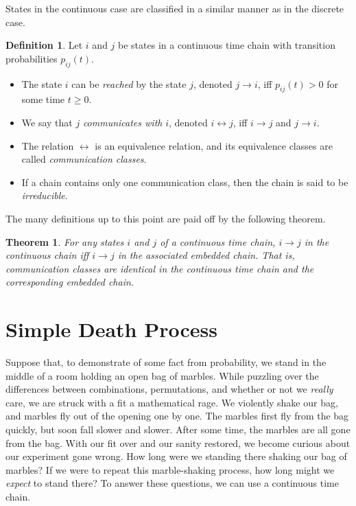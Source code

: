 \documentclass[12pt]{article}
\newtheorem{thm}{Theorem}[section]
\theoremstyle{definition}
\newtheorem{defn}{Definition}
\begin{document}
States in the continuous case are classified in a similar manner as in the
discrete case.

\begin{defn}
    \label{defn:continuous-classes}
    Let $i$ and $j$ be states in a continuous time chain with transition
    probabilities $p_{ij}(t)$.
    \begin{itemize}
        \item The state $i$ can be \emph{reached} by the state $j$, denoted $j
        \to i$, iff $p_{ij}(t) > 0$ for some time $t \geq 0$.

        \item We say that $j$ \emph{communicates with} $i$, denoted $i
        \leftrightarrow j$, iff $i \to j$ and $j \to i$.

        \item The relation $\leftrightarrow$ is an equivalence relation, and
        its equivalence classes are called \emph{communication classes}. 

        \item If a chain contains only one communication class, then the chain
        is said to be \emph{irreducible}. 
    \end{itemize}
\end{defn}

The many definitions up to this point are paid off by the following theorem.

\begin{thm}
    \label{thm:embedded-behavior}
    For any states $i$ and $j$ of a continuous time chain, $i \to j$ in the
    continuous chain iff $i \to j$ in the associated embedded chain. That is,
    communication classes are identical in the continuous time chain and the
    corresponding embedded chain.
\end{thm}

\section{Simple Death Process}
\label{sec:simple_death_process}

Suppose that, to demonstrate of some fact from probability, we stand in the
middle of a room holding an open bag of marbles. While puzzling over the
differences between combinations, permutations, and whether or not we
\emph{really} care, we are struck with a fit a mathematical rage. We violently
shake our bag, and marbles fly out of the opening one by one. The marbles first
fly from the bag quickly, but soon fall slower and slower.  After some time,
the marbles are all gone from the bag. With our fit over and our sanity
restored, we become curious about our experiment gone wrong. How long were we
standing there shaking our bag of marbles? If we were to repeat this
marble-shaking process, how long might we \emph{expect} to stand there? To
answer these questions, we can use a continuous time chain.
\end{document}
